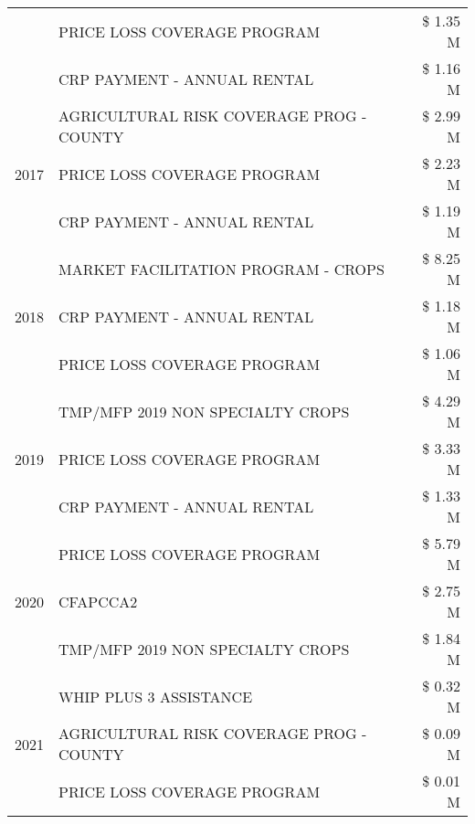 \begin{tabular}{llr}
 & PRICE LOSS COVERAGE PROGRAM & \$ 1.35 M \\
 & CRP PAYMENT - ANNUAL RENTAL & \$ 1.16 M \\
\cline{1-3}
\multirow[t]{3}{*}{2017} & AGRICULTURAL RISK COVERAGE PROG - COUNTY & \$ 2.99 M \\
 & PRICE LOSS COVERAGE PROGRAM & \$ 2.23 M \\
 & CRP PAYMENT - ANNUAL RENTAL & \$ 1.19 M \\
\cline{1-3}
\multirow[t]{3}{*}{2018} & MARKET FACILITATION PROGRAM - CROPS & \$ 8.25 M \\
 & CRP PAYMENT - ANNUAL RENTAL & \$ 1.18 M \\
 & PRICE LOSS COVERAGE PROGRAM & \$ 1.06 M \\
\cline{1-3}
\multirow[t]{3}{*}{2019} & TMP/MFP 2019 NON SPECIALTY CROPS & \$ 4.29 M \\
 & PRICE LOSS COVERAGE PROGRAM & \$ 3.33 M \\
 & CRP PAYMENT - ANNUAL RENTAL & \$ 1.33 M \\
\cline{1-3}
\multirow[t]{3}{*}{2020} & PRICE LOSS COVERAGE PROGRAM & \$ 5.79 M \\
 & CFAPCCA2 & \$ 2.75 M \\
 & TMP/MFP 2019 NON SPECIALTY CROPS & \$ 1.84 M \\
\cline{1-3}
\multirow[t]{3}{*}{2021} & WHIP PLUS 3 ASSISTANCE & \$ 0.32 M \\
 & AGRICULTURAL RISK COVERAGE PROG - COUNTY & \$ 0.09 M \\
 & PRICE LOSS COVERAGE PROGRAM & \$ 0.01 M \\
\cline{1-3}
\bottomrule
\end{tabular}
